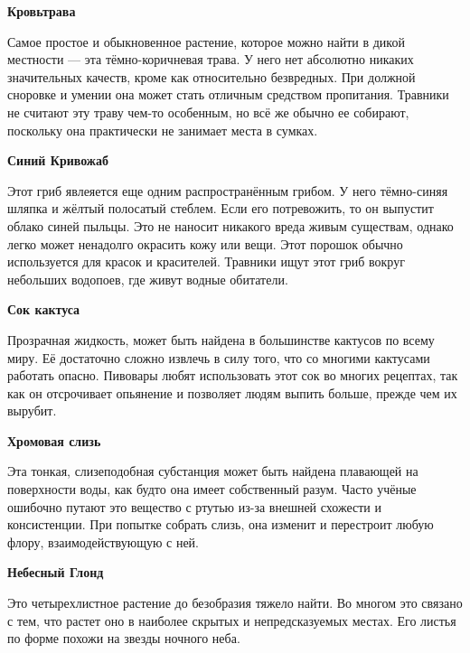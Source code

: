 \documentclass[a4paper, 9pt, twocolumn]{book}
\begin{document}
	\noindent \textbf{Кровьтрава}
	
	\smallskip
	\noindent Самое простое и обыкновенное растение, которое можно найти в дикой местности --- эта тёмно-коричневая трава. У него нет абсолютно никаких значительных качеств, кроме как относительно безвредных. При должной сноровке и умении она может стать отличным средством пропитания. Травники не считают эту траву чем-то особенным, но всё же обычно ее собирают, поскольку она практически не занимает места в сумках.
	
	\medspace
	
	\noindent \textbf{Синий Кривожаб}
	
	\smallskip
	
	\noindent Этот гриб явлеяется еще одним распространённым грибом. У него тёмно-синяя шляпка и жёлтый полосатый стеблем. Если его потревожить, то он выпустит облако синей пыльцы. Это не наносит никакого вреда живым существам, однако легко может ненадолго окрасить кожу или вещи. Этот порошок обычно используется для красок и красителей. Травники ищут этот гриб вокруг небольших водопоев, где живут водные обитатели.
	
	\medspace
	
	\noindent \textbf{Сок кактуса}
	
	\smallskip 
	
	\noindent Прозрачная жидкость, может быть найдена в большинстве кактусов по всему миру. Её достаточно сложно извлечь в силу того, что со многими кактусами работать опасно. Пивовары любят использовать этот сок во многих рецептах, так как он отсрочивает опьянение и позволяет людям выпить больше, прежде чем их вырубит.
	
	\medspace 
	
	\noindent \textbf{Хромовая слизь}
	
	\smallskip
	
	\noindent Эта тонкая, слизеподобная субстанция может быть найдена плавающей на поверхности воды, как будто она имеет собственный разум. Часто учёные ошибочно путают это вещество с ртутью из-за внешней схожести и консистенции. При попытке собрать слизь, она изменит и перестроит любую флору, взаимодействующую с ней.
	
	\medspace 
	
	\noindent \textbf{Небесный Глонд}
	
	\smallskip
	
	\noindent Это четырехлистное растение до безобразия тяжело найти. Во многом это связано с тем, что растет оно в наиболее скрытых и непредсказуемых местах. Его листья по форме похожи на звезды ночного неба.
	
\end{document}
